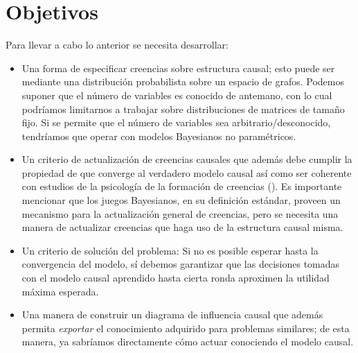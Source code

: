 \documentclass[11pt]{article}
\theoremstyle{plain}
\begin{document}
\section{Objetivos}
Para llevar a cabo lo anterior se necesita desarrollar:
\begin{itemize}
\item Una forma de especificar creencias sobre estructura causal; esto puede ser mediante una distribución probabilista sobre un espacio de grafos. Podemos suponer que el número de variables es conocido de antemano, con lo cual podríamos limitarnos a trabajar sobre distribuciones de matrices de tamaño fijo. Si se permite que el número de variables sea arbitrario/desconocido, tendríamos que operar con modelos Bayesianos no paramétricos.
\item Un criterio de actualización de creencias causales que además debe cumplir la propiedad de que converge al verdadero modelo causal así como ser coherente con estudios de la psicología de la formación de creencias (\cite{larrouy2017mindreading}). Es importante mencionar que los juegos Bayesianos, en su definición estándar, proveen un mecanismo para la actualización general de creencias, pero se necesita una manera de actualizar creencias que haga uso de la estructura causal misma.
\item Un criterio de solución del problema: Si no es posible esperar hasta la convergencia del modelo, sí debemos garantizar que las decisiones tomadas con el modelo causal aprendido hasta cierta ronda aproximen la utilidad máxima esperada.
\item Una manera de construir un diagrama de influencia causal que además permita \textit{exportar} el conocimiento adquirido para problemas similares; de esta manera, ya sabríamos directamente cómo actuar conociendo el modelo causal.
\end{itemize}
\end{document}
